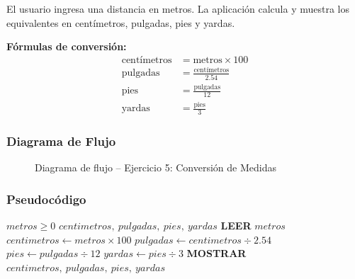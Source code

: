 \documentclass[12pt,a4paper]{article}
\begin{document}
El usuario ingresa una distancia en metros. La aplicación calcula y muestra los equivalentes en centímetros, pulgadas, pies y yardas.

\textbf{Fórmulas de conversión:}
\begin{align}
  \text{centímetros} &= \text{metros} \times 100 \\[4pt]
  \text{pulgadas}    &= \frac{\text{centímetros}}{2.54} \\[4pt]
  \text{pies}        &= \frac{\text{pulgadas}}{12} \\[4pt]
  \text{yardas}      &= \frac{\text{pies}}{3}
\end{align}

\subsubsection{Diagrama de Flujo}

\begin{figure}[H]
\centering
{}
\caption{Diagrama de flujo -- Ejercicio 5: Conversión de Medidas}
\label{fig:flujo_e5}
\end{figure}

\subsubsection{Pseudocódigo}

\begin{algorithm}[H]
\caption{Conversión de Medidas}
\label{alg:medidas}
\begin{algorithmic}[1]
  \Require $metros \geq 0$
  \Ensure $centimetros,\ pulgadas,\ pies,\ yardas$
  \State \textbf{LEER} $metros$
  \State $centimetros \leftarrow metros \times 100$
  \State $pulgadas \leftarrow centimetros \div 2.54$
  \State $pies \leftarrow pulgadas \div 12$
  \State $yardas \leftarrow pies \div 3$
  \State \textbf{MOSTRAR} $centimetros,\ pulgadas,\ pies,\ yardas$
\end{algorithmic}
\end{algorithm}
\end{document}
